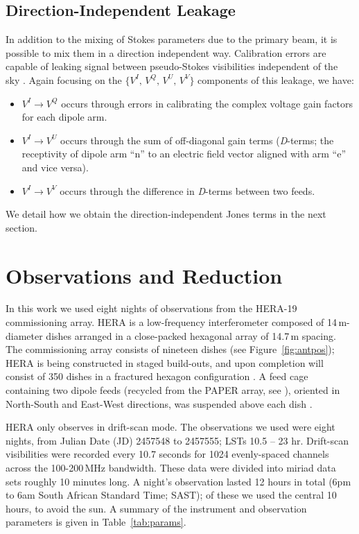 \documentclass[twocolumn, trackchanges]{aastex61}
\begin{document}
\subsection{Direction-Independent Leakage}
\label{subsec:DI-Leak}

In addition to the mixing of Stokes parameters due to the primary beam, it is
possible to mix them in a direction independent way. Calibration errors are
capable of leaking signal between pseudo-Stokes visibilities independent of the
sky \citep{TMS}. Again focusing on the $\{V^I,\,V^Q,\,V^U,\,V^V\}$ components of
this leakage, we have:
\begin{itemize}
\item $V^I \rightarrow V^Q$ occurs through errors in calibrating the complex
  voltage gain factors for each dipole arm.
\item $V^I \rightarrow V^U$ occurs through the sum of off-diagonal gain terms
  (\textit{D}-terms; the receptivity of dipole arm ``n'' to an electric field
  vector aligned with arm ``e'' and vice versa).
\item $V^I \rightarrow V^V$ occurs through the difference in \textit{D}-terms
  between two feeds.
\end{itemize}

We detail how we obtain the direction-independent Jones terms in the next
section.


\section{Observations and Reduction}
\label{sec:obs}

In this work we used eight nights of observations from the HERA-19 commissioning
array. HERA is a low-frequency interferometer composed of 14\,m-diameter dishes
arranged in a close-packed hexagonal array of 14.7\,m spacing. The commissioning
array consists of nineteen dishes (see Figure~\ref{fig:antpos}); HERA is being
constructed in staged build-outs, and upon completion will consist of 350 dishes
in a fractured hexagon configuration \citep[see][]{DillonParsons16, deBoer17}. A
feed cage containing two dipole feeds (recycled from the PAPER array, see
\citealt{Parsons.10}), oriented in North-South and East-West directions, was
suspended above each dish \citep{Neben.16,Ewall-Wice.16,Thyagarajan.16}.

HERA only observes in drift-scan mode. The observations we used were eight
nights, from Julian Date (JD) 2457548 to 2457555; LSTs 10.5 -- 23 hr. Drift-scan
visibilities were recorded every 10.7 seconds for 1024 evenly-spaced channels
across the 100-200\,MHz bandwidth. These data were divided into {\sc miriad}
data sets roughly 10 minutes long. A night's observation lasted 12 hours in
total (6pm to 6am South African Standard Time; SAST); of these we used the
central 10 hours, to avoid the sun. A summary of the instrument and observation
parameters is given in Table~\ref{tab:params}.
\end{document}
